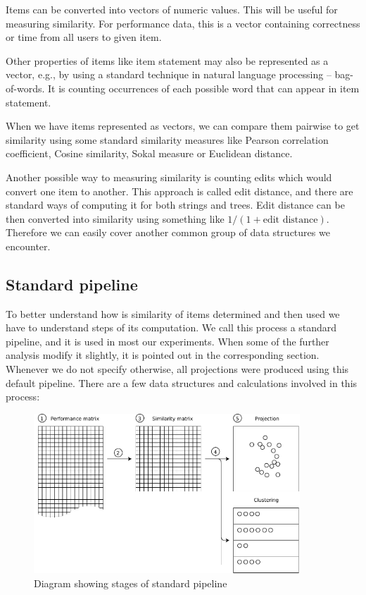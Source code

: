 \documentclass[
  digital, %
  table,   %
  nolof,     %
  nolot,     %
  nocover,
  color,
  final, %
]{fithesis3}
\begin{document}

Items can be converted into vectors of numeric values. This will be useful for measuring similarity. For performance data, this is a vector containing correctness or time from all users to given item.

Other properties of items like item statement may also be represented as a vector, e.g., by using a standard technique in natural language processing -- bag-of-words. It is counting occurrences of each possible word that can appear in item statement.

When we have items represented as vectors, we can compare them pairwise to get similarity using some standard similarity measures like Pearson correlation coefficient, Cosine similarity, Sokal measure or Euclidean distance.


Another possible way to measuring similarity is counting edits which would convert one item to another. This approach is called edit distance, and there are standard ways of computing it for both strings and trees. Edit distance can be then converted into similarity using something like $1 / (1 + \text{edit distance})$. Therefore we can easily cover another common group of data structures we encounter.


\subsection{Standard pipeline}\label{standard-pipeline}


To better understand how is similarity of items determined and then used we have to understand steps of its computation. We call this process a standard pipeline, and it is used in most our experiments. When some of the further analysis modify it slightly, it is pointed out in the corresponding section. Whenever we do not specify otherwise, all projections were produced using this default pipeline. There are a few data structures and calculations involved in this process:

\begin{figure}
  \includegraphics[width=10cm]{img/pipeline_diagram}
  \caption{Diagram showing stages of standard pipeline}
  \label{fig:pipeline_diagram}
\end{figure}
\end{document}
